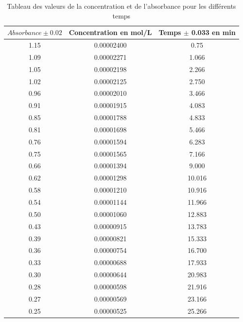 \documentclass[12pt]{article}
\begin{document}
\begin{table}[h!]
\begin{center}
    \begin{tabular}{|c|c|c|}
        \hline
        $Absorbance \pm 0.02 $ & Concentration en mol/L & Temps $\pm$ 0.033 en min \\
        \hline
                    1.15 &             0.00002400 &             0.75 \\
                    1.09 &             0.00002271 &             1.066 \\
                    1.05 &             0.00002198 &             2.266 \\
                    1.02 &             0.00002125 &             2.750 \\
                    0.96 &             0.00002010 &             3.466 \\
                    0.91 &             0.00001915 &             4.083 \\
                    0.85 &             0.00001788 &             4.833 \\
                    0.81 &             0.00001698 &             5.466 \\
                    0.76 &             0.00001594 &             6.283 \\
                    0.75 &             0.00001565 &             7.166 \\
                    0.66 &             0.00001394 &             9.000 \\
                    0.62 &             0.00001298 &            10.016 \\
                    0.58 &             0.00001210 &            10.916 \\
                    0.54 &             0.00001144 &            11.966 \\
                    0.50 &             0.00001060 &            12.883 \\
                    0.43 &             0.00000915 &            13.783 \\
                    0.39 &             0.00000821 &            15.333 \\
                    0.36 &             0.00000754 &            16.700 \\
                    0.33 &             0.00000688 &            17.933 \\
                    0.30 &             0.00000644 &            20.983 \\
                    0.28 &             0.00000598 &            21.916 \\
                    0.27 &             0.00000569 &            23.166 \\
                    0.25 &             0.00000525 &            25.266 \\
        \hline
        \end{tabular}
        \caption{Tableau des valeurs de la concentration et de l'absorbance pour les différents temps}
        \label{table1}
\end{center}
\end{table}
\end{document}
